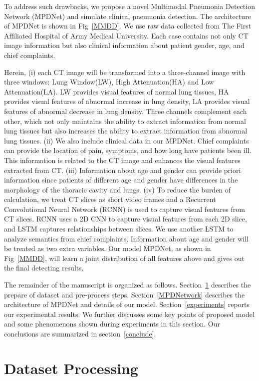 \documentclass[journal]{IEEEtran}
\begin{document}
To address such drawbacks, we propose a novel Multimodal Pneumonia Detection Network (MPDNet) and simulate clinical pneumonia detection. The architecture of MPDNet is shown in Fig~\ref{MMDD}. We use raw data collected from The First Affiliated Hospital of Army Medical University. Each case contains not only CT image information but also clinical information about patient gender, age, and chief complaints. 

Herein, (i) each CT image will be transformed into a three-channel image with three windows: Lung Window(LW), High Attenuation(HA) and Low Attenuation(LA). LW provides visual features of normal lung tissues, HA provides visual features of abnormal increase in lung density, LA provides visual features of abnormal decrease in lung density. Three channels complement each other, which not only maintains the ability to extract information from normal lung tissues but also increases the ability to extract information from abnormal lung tissues.
(ii) We also include clinical data in our MPDNet. Chief complaints can provide the location of pain, symptoms, and how long have patients been ill. This information is related to the CT image and enhances the visual features extracted from CT. 
(iii) Information about age and gender can provide priori information since patients of different age and gender have differences in the morphology of the thoracic cavity and lungs. 
(iv) To reduce the burden of calculation, we treat CT slices as short video frames and a Recurrent Convolutional Neural Network (RCNN) is used to capture visual features from CT slices. RCNN uses a 2D CNN to capture visual features from each 2D slice, and LSTM captures relationships between slices. We use another LSTM to analyze semantics from chief complaints. Information about age and gender will be treated as two extra variables. Our model MPDNet, as shown in Fig~\ref{MMDD}, will learn a joint distribution of all features above and gives out the final detecting results.

The remainder of the manuscript is organized as follows. 
Section~\ref{datasetprocessing} describes the prepare of dataset and pre-process steps.
Section~\ref{MPDNetwork} describes the architecture of MPDNet and details of our model.
Section~\ref{experiments} reports our experimental results. We further discusses some key points of proposed model and some phenomenons shown during experiments in this section.
Our conclusions are summarized in section~\ref{conclude}.


\section{Dataset Processing}
\label{datasetprocessing}
\end{document}
